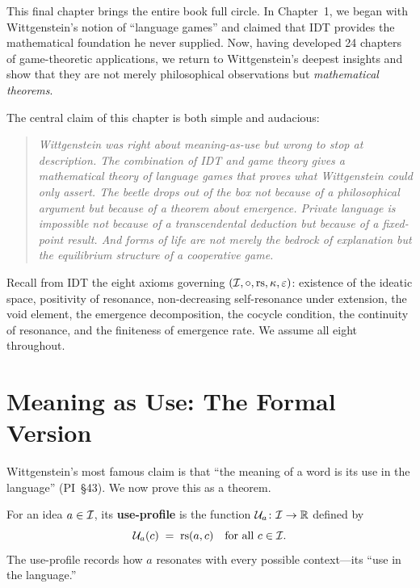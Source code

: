 This final chapter brings the entire book full circle.  In
Chapter~1, we began with Wittgenstein's notion of ``language games''
and claimed that IDT provides the mathematical foundation he
never supplied.  Now, having developed 24 chapters of game-theoretic
applications, we return to Wittgenstein's deepest insights and
show that they are not merely philosophical observations but
\emph{mathematical theorems}.

The central claim of this chapter is both simple and audacious:

\begin{quote}
\textit{Wittgenstein was right about meaning-as-use but wrong to
stop at description.  The combination of IDT and game theory
gives a mathematical theory of language games that \emph{proves}
what Wittgenstein could only assert.  The beetle drops out of
the box not because of a philosophical argument but because of
a theorem about emergence.  Private language is impossible not
because of a transcendental deduction but because of a fixed-point
result.  And forms of life are not merely the bedrock of
explanation but the equilibrium structure of a cooperative game.}
\end{quote}

Recall from IDT the eight axioms governing $(\mathcal{I}, \circ, \mathrm{rs},
\kappa, \varepsilon)$:
existence of the ideatic space, positivity of resonance,
non-decreasing self-resonance under extension, the void element,
the emergence decomposition, the cocycle condition, the continuity
of resonance, and the finiteness of emergence rate.  We assume
all eight throughout.

\section{Meaning as Use: The Formal Version}
\label{sec:meaning-as-use}

Wittgenstein's most famous claim is that ``the meaning of a word
is its use in the language'' (PI~\S43).  We now prove this as
a theorem.

\begin{definition}
\label{def:use-profile}
For an idea $a \in \mathcal{I}$, its \textbf{use-profile} is the function
$\mathcal{U}_a \colon \mathcal{I} \to \mathbb{R}$ defined by
\[
  \mathcal{U}_a(c) \;=\; \mathrm{rs}(a, c) \quad
  \text{for all } c \in \mathcal{I}.
\]
The use-profile records how $a$ resonates with every possible
context---its ``use in the language.''
\end{definition}

